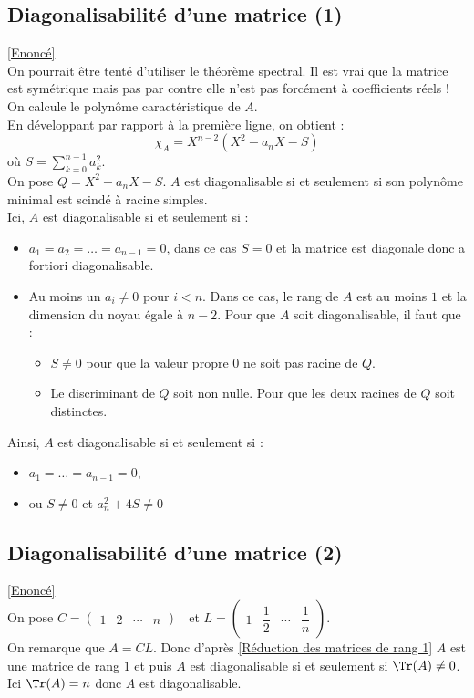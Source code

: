 \documentclass[8pt]{book}
\begin{document}
	\subsection{Diagonalisabilité d'une matrice (1) }
	\label{Diagonalisabilité d'une matrice (1) corrigé}
	\textcolor{blue}{\hyperref[Diagonalisabité d'une matrice (1)]{[Enoncé]}}\\
	On pourrait être tenté d'utiliser le théorème spectral. Il est vrai que la matrice est symétrique mais pas par contre elle n'est pas forcément à coefficients réels !\\
	On calcule le polynôme caractéristique de $A$.\\
	En développant par rapport à la première ligne, on obtient :
	\[\chi_A=X^{n-2}(X^2-a_nX-S)\]
	où $S=\displaystyle\sum_{k=0}^{n-1}a_k^2$.\\
	On pose $Q=X^2-a_nX-S$.
	$A$ est diagonalisable si et seulement si son polynôme minimal est scindé à racine simples.\\
	Ici, $A$ est diagonalisable si et seulement si :
	\begin{itemize}
		\item $a_1=a_2=\dots=a_{n-1}=0$, dans ce cas $S=0$ et la matrice est diagonale donc a fortiori diagonalisable.
		\item Au moins un $a_i\ne 0$ pour $i<n$. Dans ce cas, le rang de $A$ est au moins $1$ et la dimension du noyau égale à $n-2$. Pour que $A$ soit diagonalisable, il faut que :
		\begin{itemize}
			\item $S\ne 0$ pour que la valeur propre $0$ ne soit pas racine de $Q$.
			\item Le discriminant de $Q$ soit non nulle. Pour que les deux racines de $Q$ soit distinctes.
		\end{itemize}
	\end{itemize}
	Ainsi, $A$ est diagonalisable si et seulement si :
	\begin{itemize}
		\item $a_1=\dots=a_{n-1}=0$,
		\item ou $S\ne 0$ et $a_n^2+4S\ne 0$
	\end{itemize}
	
	\subsection{Diagonalisabilité d'une matrice (2) }
	\label{Diagonalisabilité d'une matrice (2) corrigé}
	\textcolor{blue}{\hyperref[Diagonalisabité d'une matrice (2)]{[Enoncé]}}\\
	On pose $C=\begin{pmatrix}
		1&2&\cdots&n
	\end{pmatrix}^\top$ et $L=\begin{pmatrix}
	1&\dfrac{1}{2}&\cdots&\dfrac{1}{n}
	\end{pmatrix}$.\\
	On remarque que $A=CL$. Donc d'après \ref{Réduction des matrices de rang 1} $A$ est une matrice de rang $1$ et puis $A$ est diagonalisable si et seulement si $\Tr(A)\ne 0$.\\
	Ici $\Tr(A)=n$ donc $A$ est diagonalisable.
	
\end{document}
